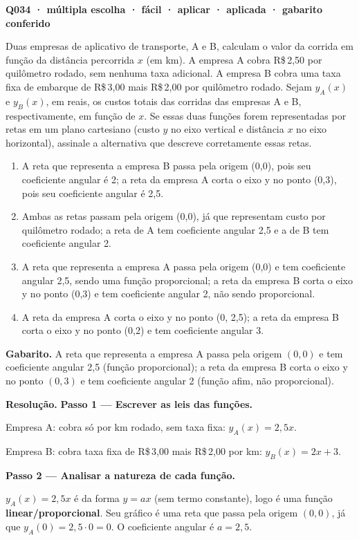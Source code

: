 \bigskip\noindent\textbf{Q034 · múltipla escolha · fácil · aplicar · aplicada · gabarito conferido}\par\nopagebreak
Duas empresas de aplicativo de transporte, A e B, calculam o valor da corrida em função da distância percorrida $x$ (em km). A empresa A cobra R\$\,2,50 por quilômetro rodado, sem nenhuma taxa adicional. A empresa B cobra uma taxa fixa de embarque de R\$\,3,00 mais R\$\,2,00 por quilômetro rodado. Sejam $y_A(x)$ e $y_B(x)$, em reais, os custos totais das corridas das empresas A e B, respectivamente, em função de $x$. Se essas duas funções forem representadas por retas em um plano cartesiano (custo $y$ no eixo vertical e distância $x$ no eixo horizontal), assinale a alternativa que descreve corretamente essas retas.
\begin{enumerate}[label=(\alph*)]
\item A reta que representa a empresa B passa pela origem (0,0), pois seu coeficiente angular é 2; a reta da empresa A corta o eixo y no ponto (0,3), pois seu coeficiente angular é 2,5.
\item Ambas as retas passam pela origem (0,0), já que representam custo por quilômetro rodado; a reta de A tem coeficiente angular 2,5 e a de B tem coeficiente angular 2.
\item A reta que representa a empresa A passa pela origem (0,0) e tem coeficiente angular 2,5, sendo uma função proporcional; a reta da empresa B corta o eixo y no ponto (0,3) e tem coeficiente angular 2, não sendo proporcional.
\item A reta da empresa A corta o eixo y no ponto (0, 2,5); a reta da empresa B corta o eixo y no ponto (0,2) e tem coeficiente angular 3.
\end{enumerate}

\textbf{Gabarito.} A reta que representa a empresa A passa pela origem $(0,0)$ e tem coeficiente angular 2,5 (função proporcional); a reta da empresa B corta o eixo y no ponto $(0,3)$ e tem coeficiente angular 2 (função afim, não proporcional).

\textbf{Resolução.} \textbf{Passo 1 — Escrever as leis das funções.}

Empresa A: cobra só por km rodado, sem taxa fixa: $y_A(x) = 2{,}5x$.

Empresa B: cobra taxa fixa de R\$\,3,00 mais R\$\,2,00 por km: $y_B(x) = 2x + 3$.

\textbf{Passo 2 — Analisar a natureza de cada função.}

$y_A(x) = 2{,}5x$ é da forma $y = ax$ (sem termo constante), logo é uma função \textbf{linear/proporcional}. Seu gráfico é uma reta que passa pela origem $(0,0)$, já que $y_A(0) = 2{,}5 \cdot 0 = 0$. O coeficiente angular é $a = 2{,}5$.

